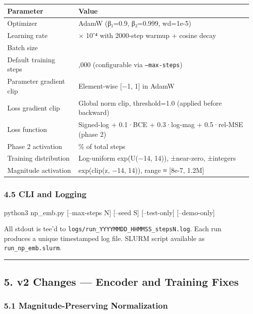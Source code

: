 \documentclass[11pt]{article}
\begin{document}
\begin{longtable}{|>{\raggedright\arraybackslash}p{}|>{\raggedright\arraybackslash}p{}|}
\hline
\textbf{Parameter} & \textbf{Value} \\ \hline
Optimizer & AdamW (β₁=0.9, β₂=0.999, wd=1e-5) \\ \hline
Learning rate & 5 × 10⁻⁴ with 2000-step warmup + cosine decay \\ \hline
Batch size & 256 \\ \hline
Default training steps & 100,000 (configurable via \texttt{--max-steps}) \\ \hline
Parameter gradient clip & Element-wise [−1, 1] in AdamW \\ \hline
Loss gradient clip & Global norm clip, threshold=1.0 (applied before backward) \\ \hline
Loss function & Signed-log + 0.1·BCE + 0.3·log-mag + 0.5·rel-MSE (phase 2) \\ \hline
Phase 2 activation & 30\% of total steps \\ \hline
Training distribution & Log-uniform exp(U(−14, 14)), ±near-zero, ±integers \\ \hline
Magnitude activation & exp(clip(z, −14, 14)), range ≈ [8e-7, 1.2M] \\ \hline
\end{longtable}


\subsubsection*{4.5 CLI and Logging}


\begin{CodeBlock}
python3 np_emb.py [--max-steps N] [--seed S] [--test-only] [--demo-only]
\end{CodeBlock}


All stdout is tee'd to \texttt{logs/run\_YYYYMMDD\_HHMMSS\_stepsN.log}. Each run produces a unique timestamped log file. SLURM script available as \texttt{run\_np\_emb.slurm}.


\noindent\rule{\textwidth}{0.4pt}


\subsection*{5. v2 Changes — Encoder and Training Fixes}


\subsubsection*{5.1 Magnitude-Preserving Normalization}
\end{document}
